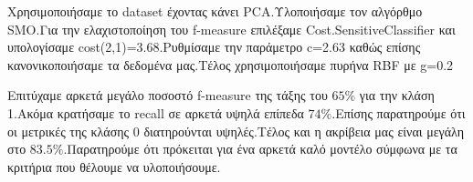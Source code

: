 Χρησιμοποιήσαμε το dataset έχοντας κάνει PCA.Υλοποιήσαμε τον αλγόρθμο SMO.Για την ελαχιστοποίηση του f-measure επιλέξαμε Cost.SensitiveClassifier και υπολογίσαμε cost(2,1)=3.68.Ρυθμίσαμε την παράμετρο c=2.63 καθώς επίσης κανονικοποιήσαμε τα δεδομένα μας.Τέλος χρησιμοποιήσαμε πυρήνα RBF με g=0.2

Επιτύχαμε αρκετά μεγάλο ποσοστό f-measure της τάξης του $65\%$ για την κλάση 1.Ακόμα κρατήσαμε το recall σε αρκετά υψηλά επίπεδα $74\%$.Επίσης παρατηρούμε ότι οι μετρικές της κλάσης 0 διατηρούνται υψηλές.Τέλος και η ακρίβεια μας είναι μεγάλη στο $83.5\%$.Παρατηρούμε ότι πρόκειται για ένα αρκετά καλό μοντέλο σύμφωνα με τα κριτήρια που θέλουμε να υλοποιήσουμε.